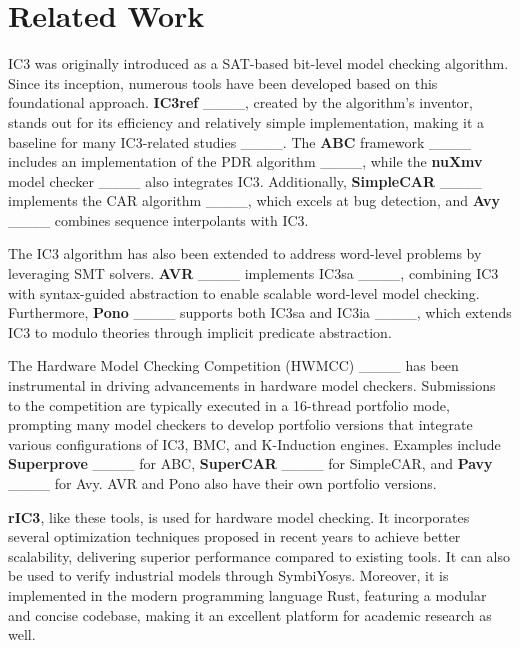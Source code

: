 \section{Related Work}
IC3 was originally introduced as a SAT-based bit-level model checking algorithm. Since its inception, numerous tools have been developed based on this foundational approach. \textbf{IC3ref} ____, created by the algorithm’s inventor, stands out for its efficiency and relatively simple implementation, making it a baseline for many IC3-related studies ____. The \textbf{ABC} framework ____ includes an implementation of the PDR algorithm ____, while the \textbf{nuXmv} model checker ____ also integrates IC3. Additionally, \textbf{SimpleCAR} ____ implements the CAR algorithm ____, which excels at bug detection, and \textbf{Avy} ____ combines sequence interpolants with IC3.

The IC3 algorithm has also been extended to address word-level problems by leveraging SMT solvers. \textbf{AVR} ____ implements IC3sa ____, combining IC3 with syntax-guided abstraction to enable scalable word-level model checking. Furthermore, \textbf{Pono} ____ supports both IC3sa and IC3ia ____, which extends IC3 to modulo theories through implicit predicate abstraction.

The Hardware Model Checking Competition (HWMCC) ____ has been instrumental in driving advancements in hardware model checkers. Submissions to the competition are typically executed in a 16-thread portfolio mode, prompting many model checkers to develop portfolio versions that integrate various configurations of IC3, BMC, and K-Induction engines. Examples include \textbf{Superprove} ____ for ABC, \textbf{SuperCAR} ____ for SimpleCAR, and \textbf{Pavy} ____ for Avy. AVR and Pono also have their own portfolio versions.

\textbf{rIC3}, like these tools, is used for hardware model checking. It incorporates several optimization techniques proposed in recent years to achieve better scalability, delivering superior performance compared to existing tools. It can also be used to verify industrial models through SymbiYosys. Moreover, it is implemented in the modern programming language Rust, featuring a modular and concise codebase, making it an excellent platform for academic research as well.